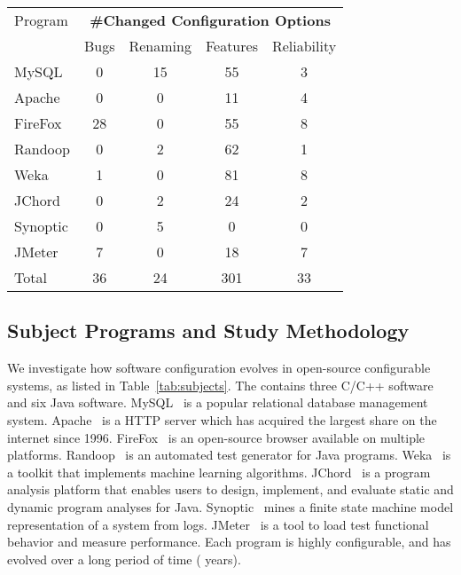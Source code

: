 \begin{table}[t]
\vspace{1mm}
\centering
\small{
\setlength{\tabcolsep}{.50\tabcolsep}
\begin{tabular}{|l|c|c|c|c|}
\hline
 Program & \multicolumn{4}{|c|}{\textbf{\#Changed Configuration Options}} \\
 \cline{2-5}
 & Bugs & Renaming & Features & Reliability \\
 \hline
 \hline
 MySQL & 0 & 15 & 55 & 3 \\
 Apache& 0 & 0 & 11 & 4 \\
 FireFox& 28 & 0 & 55 & 8 \\
 Randoop & 0  & 2 & 62  & 1\\
 Weka & 1  & 0 & 81  & 8 \\
 JChord & 0  & 2 & 24 & 2\\ %
 Synoptic & 0 &  5 & 0 & 0\\
 JMeter & 7  & 0 & 18 & 7 \\
\hline
\hline
 Total & 36 & 24 & 301 & 33 \\
\hline
\end{tabular}
}
\vspace{-2mm}
\end{table}


\subsection{Subject Programs and Study Methodology}

We investigate how software configuration evolves in
\studysubjnum open-source configurable systems, as listed
in Table~\ref{tab:subjects}. The \studysubjnum contains
three C/C++ software and six Java software.
MySQL~\cite{}  is a popular relational database management
system. Apache~\cite{} is a HTTP server which has acquired
the largest share on the internet since 1996. FireFox~\cite{}
is an open-source browser available on multiple platforms.
Randoop~\cite{} is an automated test generator for Java
programs. Weka~\cite{} is a toolkit that implements machine
learning algorithms. JChord~\cite{} is a program analysis platform that
enables users to design, implement, and evaluate static and
dynamic program analyses for Java. Synoptic~\cite{} mines a
finite state machine model representation of a system from
logs. JMeter~\cite{} is a tool to load test functional
behavior and measure performance.
Each program is highly configurable, and has evolved over
a long period of time ( years).


